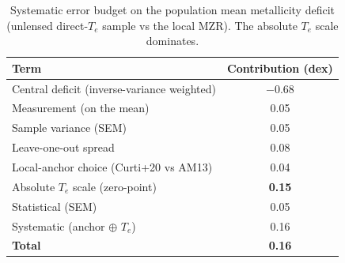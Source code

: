 \begin{table}[t]
\centering
\caption{Systematic error budget on the population mean metallicity deficit
(unlensed direct-$T_e$ sample vs the local MZR). The absolute $T_e$ scale dominates.}
\begin{tabular}{lc}
\hline
Term & Contribution (dex) \\
\hline
Central deficit (inverse-variance weighted) & $-0.68$ \\
\hline
Measurement (on the mean)      & 0.05 \\
Sample variance (SEM)          & 0.05 \\
Leave-one-out spread           & 0.08 \\
Local-anchor choice (Curti+20 vs AM13) & 0.04 \\
Absolute $T_e$ scale (zero-point) & \textbf{0.15} \\
\hline
Statistical (SEM)              & 0.05 \\
Systematic (anchor $\oplus$ $T_e$) & 0.16 \\
\textbf{Total}                 & \textbf{0.16} \\
\hline
\end{tabular}
\end{table}
